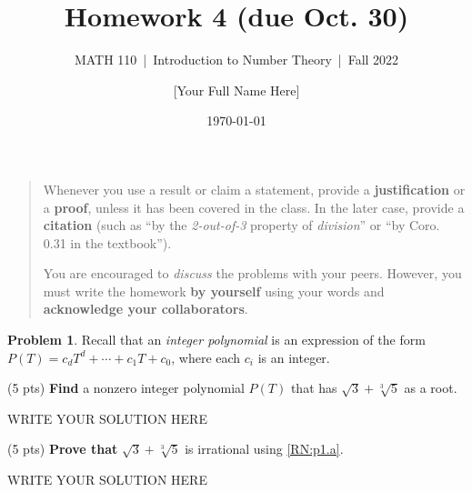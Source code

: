 \documentclass[11pt]{article}
\title{Homework 4 (due Oct. 30)}
\author{[Your Full Name Here]}
\subtitle{MATH 110~|~Introduction to Number Theory~|~Fall 2022}
\date{\today}
\theoremstyle{plain}
\theoremstyle{definition}
\newtheorem{problem}{Problem}
\theoremstyle{remark}
\numberwithin{equation}{problem}
\begin{document}
\maketitle

\begin{quotation}
Whenever you use a result or claim a statement, provide a \textbf{justification} or a \textbf{proof}, unless it has been covered in the class. In the later case, provide a \textbf{citation} (such as ``by the \emph{2-out-of-3} property of \emph{division}'' or ``by Coro. 0.31 in the textbook'').

You are encouraged to \emph{discuss} the problems with your peers. However, you must write the homework \textbf{by yourself} using your words and \textbf{acknowledge your collaborators}.
\end{quotation}

\begin{problem}
	Recall that an \emph{integer polynomial} is an expression of the form $P(T)=c_dT^d+\cdots+c_1T+c_0$, where each $c_i$ is an integer. 
	\begin{listinprob}
		\item\label{RN:p1.a} (5 pts) \textbf{Find} a nonzero integer polynomial $P(T)$ that has $\sqrt{3}+\sqrt[3]{5}$ as a root.
\begin{solution} %
WRITE YOUR SOLUTION HERE
\end{solution}\clearpage %
		\item (5 pts) \textbf{Prove that} $\sqrt{3}+\sqrt[3]{5}$ is irrational using \ref{RN:p1.a}.
	\end{listinprob}
\end{problem}
\begin{solution} %
WRITE YOUR SOLUTION HERE
\end{solution}\clearpage %
\end{document}

